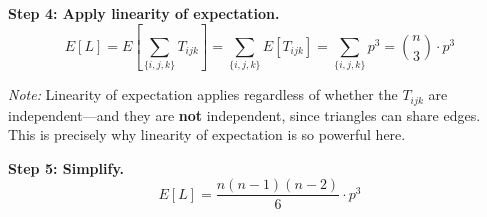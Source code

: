 \documentclass[11pt]{article}
\begin{document}
\textbf{Step 4: Apply linearity of expectation.}
\[
E[L] = E\left[\sum_{\{i,j,k\}} T_{ijk}\right] = \sum_{\{i,j,k\}} E[T_{ijk}] = \sum_{\{i,j,k\}} p^3 = \binom{n}{3} \cdot p^3
\]

\textit{Note:} Linearity of expectation applies regardless of whether the $T_{ijk}$ are independent---and they are \textbf{not} independent, since triangles can share edges. This is precisely why linearity of expectation is so powerful here.

\textbf{Step 5: Simplify.}
\[
E[L] = \frac{n(n-1)(n-2)}{6} \cdot p^3
\]

\begin{center}
\end{center}
\end{document}

